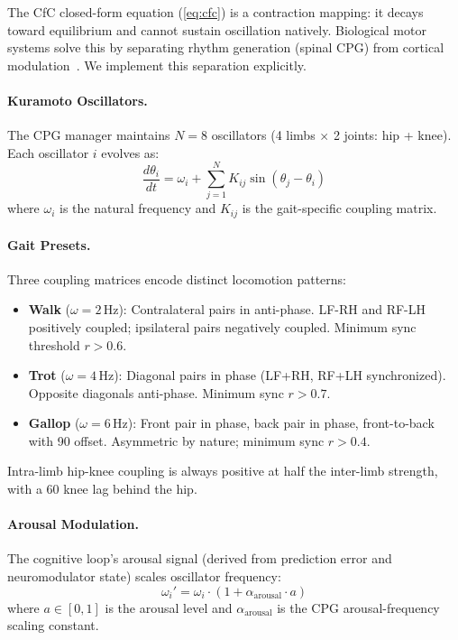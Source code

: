 \documentclass[11pt,twocolumn]{article}
\begin{document}
The CfC closed-form equation (\cref{eq:cfc}) is a contraction mapping: it decays toward equilibrium and cannot sustain oscillation natively. Biological motor systems solve this by separating rhythm generation (spinal CPG) from cortical modulation~\cite{grillner2006biological}. We implement this separation explicitly.

\paragraph{Kuramoto Oscillators.} The CPG manager maintains $N = 8$ oscillators (4 limbs $\times$ 2 joints: hip + knee). Each oscillator $i$ evolves as:
\begin{equation}
\frac{d\theta_i}{dt} = \omega_i + \sum_{j=1}^{N} K_{ij} \sin(\theta_j - \theta_i)
\end{equation}
where $\omega_i$ is the natural frequency and $K_{ij}$ is the gait-specific coupling matrix.

\paragraph{Gait Presets.} Three coupling matrices encode distinct locomotion patterns:

\begin{itemize}[nosep]
  \item \textbf{Walk} ($\omega = 2$\,Hz): Contralateral pairs in anti-phase. LF-RH and RF-LH positively coupled; ipsilateral pairs negatively coupled. Minimum sync threshold $r > 0.6$.
  \item \textbf{Trot} ($\omega = 4$\,Hz): Diagonal pairs in phase (LF+RH, RF+LH synchronized). Opposite diagonals anti-phase. Minimum sync $r > 0.7$.
  \item \textbf{Gallop} ($\omega = 6$\,Hz): Front pair in phase, back pair in phase, front-to-back with 90\textdegree{} offset. Asymmetric by nature; minimum sync $r > 0.4$.
\end{itemize}

Intra-limb hip-knee coupling is always positive at half the inter-limb strength, with a 60\textdegree{} knee lag behind the hip.

\paragraph{Arousal Modulation.} The cognitive loop's arousal signal (derived from prediction error and neuromodulator state) scales oscillator frequency:
\begin{equation}
\omega_i' = \omega_i \cdot (1 + \alpha_{\text{arousal}} \cdot a)
\end{equation}
where $a \in [0, 1]$ is the arousal level and $\alpha_{\text{arousal}}$ is the CPG arousal-frequency scaling constant.
\end{document}
